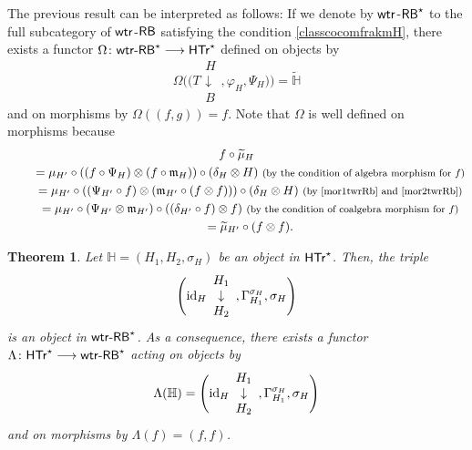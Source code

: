 \documentclass[pdftex]{sigma}
\numberwithin{equation}{section}
\newtheorem{Theorem}{Theorem}[section]
\begin{document}
The previous result can be interpreted as follows: If we denote by ${\sf wtr}$-${\sf RB}^{\star}$ to the full subcategory of ${\sf wtr}$-${\sf RB}$ satisfying the condition \eqref{classcocomfrakmH}, there exists a functor
$\Omega\colon {\sf wtr}\textnormal{-}{\sf RB}^{\star}\longrightarrow \sf{HTr}^{\star}$
defined on objects by
\[
\Omega\Biggl(\Biggl(T\begin{array}{c}H\\\downarrow\\B\end{array},\varphi_{H},\Psi_{H}\Biggr)\Biggr)=\widetilde{\mathbb{H}}
\]
and on morphisms by $\Omega((f,g))=f$. Note that $\Omega$ is well defined on morphisms because
\begin{gather*}
f\circ\widetilde{\mu}_{H}\\
\qquad{}=\mu_{H'}\circ((f\circ\Psi_{H})\otimes(f\circ\mathfrak{m}_{H}))\circ(\delta_{H}\otimes H)\ \text{\footnotesize\textnormal{(by the condition of algebra morphism for $f$)}}\\
\qquad{}=\mu_{H'}\circ((\Psi_{H'}\circ f)\otimes(\mathfrak{m}_{H'}\circ(f\otimes f)))\circ(\delta_{H}\otimes H)\ \text{\footnotesize\textnormal{(by \eqref{mor1twrRb} and \eqref{mor2twrRb})}}\\
\qquad{}=\mu_{H'}\circ(\Psi_{H'}\otimes\mathfrak{m}_{H'})\circ((\delta_{H'}\circ f)\otimes f)\ \text{\footnotesize\textnormal{(by the condition of coalgebra morphism for $f$)}}\\
\qquad{}=\widetilde{\mu}_{H'}\circ(f\otimes f).
\end{gather*}
\begin{Theorem}\label{funLambda}
Let $\mathbb{H}=(H_{1},H_{2},\sigma_{H})$ be an object in $\sf{HTr}^{\star}$. Then, the triple
\[
\Biggl({\rm id}_{H}\begin{array}{c}H_{1}\\\downarrow\\H_{2}\end{array},\Gamma_{H_{1}}^{\sigma_{H}},\sigma_{H}\Biggr)
\]
 is an object in ${\sf wtr}\textnormal{-}{\sf RB}^{\star}$. As a consequence, there exists a functor
$\Lambda\colon \sf{HTr}^{\star}\longrightarrow {\sf wtr}\textnormal{-}{\sf RB}^{\star}$
acting on objects by
\[
\Lambda(\mathbb{H})=\Biggl({\rm id}_{H}\begin{array}{c}H_{1}\\\downarrow\\H_{2}\end{array},\Gamma_{H_{1}}^{\sigma_{H}},\sigma_{H}\Biggr)
\]
and on morphisms by $\Lambda(f)=(f,f)$.
\end{Theorem}
\end{document}
